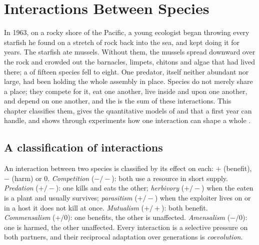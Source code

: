 \chapter{Interactions Between Species}\label{ch:b1:species-interactions}

In 1963, on a rocky shore of the Pacific, a young ecologist began
throwing every starfish he found on a stretch of rock back into the
sea, and kept doing it for years. The starfish ate mussels. Without
them, the mussels spread downward over the rock and crowded out the
barnacles, limpets, chitons and algae that had lived there; a
 of fifteen species fell to eight. One predator, itself
neither abundant nor large, had been holding the whole assembly in
place. Species do not merely share a place; they compete for it, eat
one another, live inside and upon one another, and depend on one
another, and the  is the sum of these interactions. This
chapter classifies them, gives the quantitative models of 
and  that a first year can handle, and shows through
experiments how one interaction can shape a whole .

\section{A classification of interactions}

\begin{definition}\label{def:b1:species-interactions:types}
An interaction between two species is classified by its effect on
each: $+$ (benefit), $-$ (harm) or $0$. \emph{Competition} ($-/-$): both
use a resource in short supply. \emph{Predation} ($+/-$): one kills
and eats the other; \emph{herbivory} ($+/-$) when the eaten is a plant
and usually survives; \emph{parasitism} ($+/-$) when the exploiter
lives on or in a host it does not kill at once. \emph{Mutualism}
($+/+$): both benefit. \emph{Commensalism} ($+/0$): one benefits, the
other is unaffected. \emph{Amensalism} ($-/0$): one is harmed, the
other unaffected. Every interaction is a selective pressure on both
partners, and their reciprocal adaptation over generations is
\emph{coevolution}.
\end{definition}

